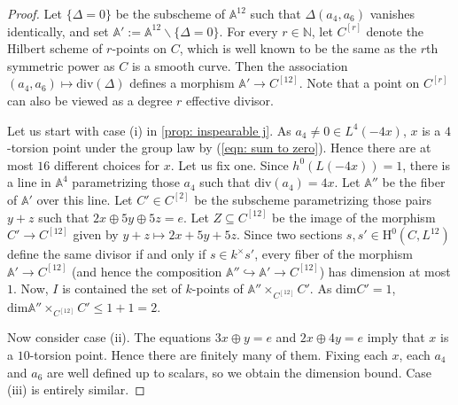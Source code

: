 \documentclass[10pt,a4paper]{amsart}
\newcommand{\IA}{\mathbb{A}}
\newcommand{\IN}{\mathbb{N}}
\newcommand{\into}{\hookrightarrow}
\renewcommand{\H}{\mathrm{H}}
\renewcommand{\dim}{\mathrm{dim}}
\begin{document}
\begin{proof}
     
    Let $\{ \Delta = 0 \}$ be the subscheme of $\IA^{12}$ such that $\Delta(a_4, a_6)$ vanishes identically, and set $\IA' := \IA^{12} \smallsetminus \{ \Delta = 0 \}$. 
    For every $r \in \IN$, let $C^{[r]}$ denote the Hilbert scheme of $r$-points on $C$, which is well known to be the same as the $r$th symmetric power as $C$ is a smooth curve. 
    Then the association $(a_4, a_6) \mapsto \mathrm{div}(\Delta)$ defines a morphism $\IA' \to C^{[12]}$. 
    Note that a point on $C^{[r]}$ can also be viewed as a degree $r$ effective divisor. 

    Let us start with case (i) in \cref{prop: inspearable j}. As $a_4 \neq 0 \in L^4(-4 x)$, $x$ is a $4$-torsion point under the group law by (\ref{eqn: sum to zero}). Hence there are at most $16$ different choices for $x$. Let us fix one. Since $h^0(L(-4x)) = 1$, there is a line in $\IA^4$ parametrizing those $a_4$ such that $\mathrm{div}(a_4) = 4x$. 
    Let $\IA''$ be the fiber of $\IA'$ over this line.  
    Let $C' \in C^{[2]}$ be the subscheme parametrizing those pairs $y + z$ such that $2x \oplus 5y \oplus 5z = e$.
    Let $Z \subseteq C^{[12]}$ be the image of the morphism $C' \to C^{[12]}$ given by $y + z \mapsto 2 x + 5y + 5z$. 
    Since two sections $s, s' \in \H^0(C, L^{12})$ define the same divisor if and only if $s \in k^\times s'$, every fiber of the morphism $\IA' \to C^{[12]}$ (and hence the composition $\IA'' \into \IA' \to C^{[12]}$) has dimension at most $1$.
    Now, $I$ is contained the set of $k$-points of $\IA'' \times_{C^{[12]}} C'$. 
    As $\dim C' = 1$, $\dim \IA'' \times_{C^{[12]}} C' \le 1 + 1 = 2$. 

    Now consider case (ii). The equations $3 x \oplus y = e$ and $2x \oplus 4y = e$ imply that $x$ is a $10$-torsion point. Hence there are finitely many of them. Fixing each $x$, each $a_4$ and $a_6$ are well defined up to scalars, so we obtain the dimension bound. Case (iii) is entirely similar. 
\end{proof}
\end{document}
